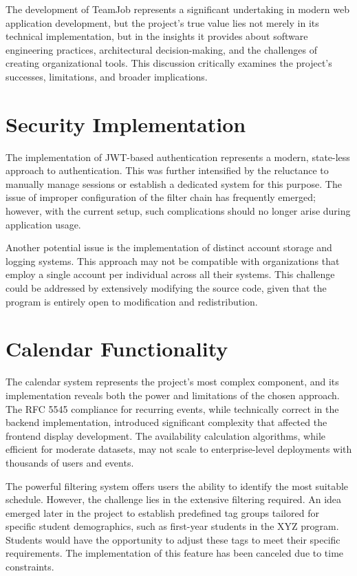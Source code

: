 The development of TeamJob represents a significant undertaking in modern web application development, but the project's true value lies not merely in its technical implementation, but in the insights it provides about software engineering practices, architectural decision-making, and the challenges of creating organizational tools.
This discussion critically examines the project's successes, limitations, and broader implications.


\section{Security Implementation}\label{sec:security-implementation}

The implementation of JWT-based authentication represents a modern, state-less approach to authentication.
This was further intensified by the reluctance to manually manage sessions or establish a dedicated system for this purpose.
The issue of improper configuration of the filter chain has frequently emerged; however, with the current setup, such complications should no longer arise during application usage.

Another potential issue is the implementation of distinct account storage and logging systems.
This approach may not be compatible with organizations that employ a single account per individual across all their systems.
This challenge could be addressed by extensively modifying the source code, given that the program is entirely open to modification and redistribution.


\section{Calendar Functionality}\label{sec:calendar-functionality}

The calendar system represents the project's most complex component, and its implementation reveals both the power and limitations of the chosen approach.
The RFC 5545 compliance for recurring events, while technically correct in the backend implementation, introduced significant complexity that affected the frontend display development.
The availability calculation algorithms, while efficient for moderate datasets, may not scale to enterprise-level deployments with thousands of users and events.

The powerful filtering system offers users the ability to identify the most suitable schedule.
However, the challenge lies in the extensive filtering required.
An idea emerged later in the project to establish predefined tag groups tailored for specific student demographics, such as first-year students in the XYZ program.
Students would have the opportunity to adjust these tags to meet their specific requirements.
The implementation of this feature has been canceled due to time constraints.


